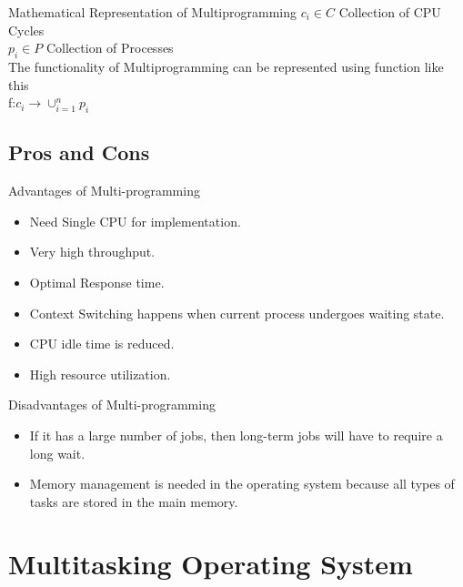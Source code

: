 \documentclass{beamer}
\begin{document}
\begin{frame}{Mathematical Representation of Multiprogramming}
$c_i\in C$ Collection of CPU Cycles\\
\vskip 0.2in
$p_i\in P$ Collection of Processes\\
\vskip 0.2in
The functionality of Multiprogramming can be represented using function like this\\
f:$c_i\rightarrow\cup_{i=1}^np_i$

\end{frame}

\subsection{Pros and Cons}
{

\begin{frame}{Advantages of Multi-programming}
    \begin{itemize}
         
    
    \item  Need Single CPU for implementation.
    \item  Very high throughput.
    \item Optimal Response time.
    \item  Context Switching happens when current process undergoes waiting state.
    \item  CPU idle time is reduced.
    \item  High resource utilization.
    
    \end{itemize}
    
\end{frame}
}

\begin{frame}{Disadvantages of Multi-programming}
    \begin{itemize}
        \item If it has a large number of jobs, then long-term jobs will have to require a long wait.
        \item Memory management is needed in the operating system because all types of tasks are stored in the main memory.
    \end{itemize}
    
\end{frame}

\section{Multitasking Operating System}
\end{document}

